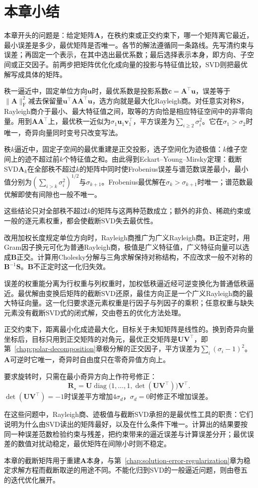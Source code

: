 \section{本章小结}
\label{sec:matrix-approximation-summary}

本章开头的问题是：给定矩阵$\bm A$，在秩约束或正交约束下，哪一个矩阵离它最近，最小误差是多少，最优矩阵是否唯一。各节的解法遵循同一条路线。先写清约束与误差；再固定一个表示，在其中选出最优系数；最后选择表示本身，即方向、子空间或正交因子。前两步把矩阵优化化成向量的投影与特征值比较，SVD则把最优解写成具体的矩阵。

秩一逼近中，固定单位方向$\bm u$时，最优系数是投影系数$\bm c=\bm A^\top\bm u$，误差等于$\lVert\bm A\rVert_{\mathrm F}^2$减去保留量$\bm u^\top\bm A\bm A^\top\bm u$，选方向就是最大化Rayleigh商。对任意实对称$\bm S$，Rayleigh商介于最小、最大特征值之间，取等的方向恰是相应特征空间中的非零向量。用到$\bm A\bm A^\top$上，最优秩一近似为$\sigma_1\bm u_1\bm v_1^\top$，平方误差为$\sum_{i\geq2}\sigma_i^2$。它在$\sigma_1>\sigma_2$时唯一，奇异向量同时变号只改变写法。

秩$k$逼近中，固定子空间的最优重建是正交投影，选子空间化为迹极值：$k$维子空间上的迹不超过前$k$个特征值之和。由此得到Eckart--Young--Mirsky定理：截断SVD$\bm A_k$在全部秩不超过$k$的矩阵中同时使Frobenius误差与谱范数误差最小，最小值分别为$(\sum_{i>k}\sigma_i^2)^{1/2}$与$\sigma_{k+1}$。Frobenius最优解在$\sigma_k>\sigma_{k+1}$时唯一；谱范数最优解即使有间隙也一般不唯一。

这些结论只对全部秩不超过$k$的矩阵与这两种范数成立；额外的非负、稀疏约束或一般的逐元素权重，都会使截断SVD失去最优性。

改用加权长度规定单位方向时，Rayleigh商推广为广义Rayleigh商。$\bm B$正定时，用Gram因子换元可化为普通Rayleigh商，极值是广义特征值，广义特征向量可以选成$\bm B$正交。计算用Cholesky分解与三角求解保持对称结构，不应改求一般不对称的$\bm B^{-1}\bm S$。$\bm B$不正定时这一化归失效。

误差的权重能分离为行权重与列权重时，加权低秩逼近经可逆变换化为普通低秩逼近。最优解由变换后矩阵的截断SVD还原，最佳方向正是一个广义Rayleigh商的最大特征向量。这一化归要求逐元素权重是行因子与列因子的乘积；任意权重与缺失元素没有截断SVD式的闭式解，交由卷五的优化方法处理。

正交约束下，距离最小化成迹最大化，目标关于未知矩阵是线性的。换到奇异向量坐标后，目标只用到正交矩阵的对角元，最优正交矩阵是$\bm U\bm V^\top$，即第~\ref{chap:polar-decomposition}章极分解的正交因子，平方误差为$\sum_i(\sigma_i-1)^2$。$\bm A$可逆时它唯一，奇异时自由度只在零奇异值方向上。

要求旋转时，只需在最小奇异方向上作符号修正：
\[
 \bm R_\star=\bm U\operatorname{diag}\bigl(1,\ldots,1,\det(\bm U\bm V^\top)\bigr)\bm V^\top .
\]
$\det(\bm U\bm V^\top)=-1$时误差平方增加$4\sigma_d$，$\sigma_d=0$时修正不增加误差。

在这些问题中，Rayleigh商、迹极值与截断SVD承担的是最优性工具的职责：它们说明为什么由SVD读出的矩阵最好，以及在什么条件下唯一。计算出的结果要按同一种误差范数检验约束与残差，把约束带来的逼近误差与计算误差分开；最优误差的数值对扰动稳定，最优矩阵在间隙小时则不稳定。

本章的截断矩阵用于重建$\bm A$本身，与第~\ref{chap:solution-error-regularization}章为稳定求解方程而截断取逆的用途不同。不能化归到SVD的一般逼近问题，则由卷五的迭代优化展开。
